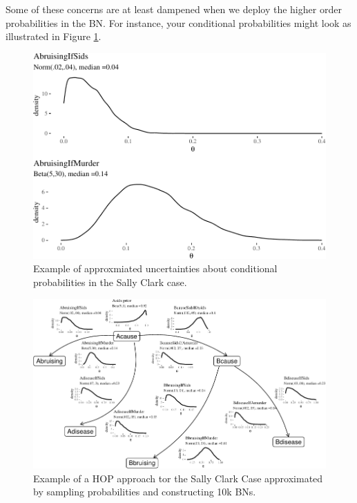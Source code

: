 \documentclass[
  10pt,
  dvipsnames,enabledeprecatedfontcommands]{scrartcl}
\begin{document}
Some of these concerns are at least dampened when we deploy the higher
order probabilities in the BN. For instance, your conditional
probabilities might look as illustrated in Figure \ref{fig:SCwithHOPa}.

\begin{figure}

\begin{center}\includegraphics[width=0.9\linewidth]{imprecision_weight_files/figure-latex/fig:SCwithHOPa-1} \end{center}

\caption{Example of approxmiated uncertainties about conditional probabilities in the Sally Clark case.}
\label{fig:SCwithHOPa}
\end{figure}

\pagebreak 
\begin{figure}

\begin{center}\includegraphics[width=1.6\linewidth,height=2\textheight,angle=90]{imprecision_weight_files/figure-latex/SCwithHOP-1} \end{center}

\caption{Example of a HOP approach tor the Sally Clark Case  approximated by sampling probabilities  and constructing 10k BNs.}
\label{fig:SCwithHOP}
\end{figure}
\end{document}
